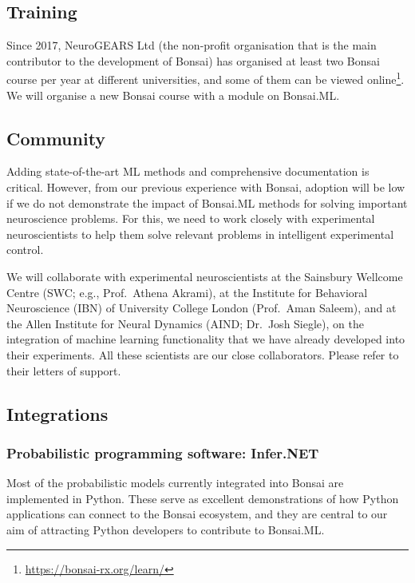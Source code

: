 \subsection*{Training}

Since 2017, NeuroGEARS Ltd (the non-profit organisation that is the main
contributor to the development of Bonsai) has organised at least two Bonsai
course per year at different universities, and some of them can be viewed
online\footnote[5]{\url{https://bonsai-rx.org/learn/}}. We will organise a new
Bonsai course with a module on Bonsai.ML.

\subsection*{Community}

Adding state-of-the-art ML methods and comprehensive documentation is critical.
However, from our previous experience with Bonsai, adoption will be low if we
do not demonstrate the impact of Bonsai.ML methods for solving important
neuroscience problems.
%
For this, we need to work closely with experimental neuroscientists to help
them solve relevant problems in intelligent experimental control.

We will collaborate with experimental neuroscientists at the Sainsbury Wellcome
Centre (SWC; e.g., Prof.~Athena Akrami), at the Institute for Behavioral
Neuroscience (IBN) of University College London (Prof.~Aman Saleem), and at the
Allen Institute for Neural Dynamics (AIND; Dr.~Josh Siegle), on the integration
of machine learning functionality that we have already developed into their
experiments.
%
All these scientists are our close collaborators. Please refer to their letters
of support.

\subsection*{Integrations}

\subsubsection*{Probabilistic programming software: Infer.NET}

Most of the probabilistic models currently integrated into Bonsai are
implemented in Python. These serve as excellent demonstrations of how Python
applications can connect to the Bonsai ecosystem, and they are central to our
aim of attracting Python developers to contribute to Bonsai.ML.

